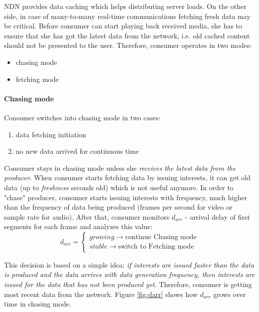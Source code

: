 \documentclass[10pt]{proc}
\begin{document}
NDN provides data caching which helps distributing server loads. On the other side, in case of many-to-many real-time communications fetching fresh data may be critical. 
Before consumer can start playing back received media, she has to ensure that she has got the latest data from the network, i.e. old cached content should not be presented to the user. Therefore, consumer operates in two modes: 
\begin{itemize}
\item chasing mode 
\item fetching mode
\end{itemize}

\paragraph{Chasing mode}
Consumer switches into chasing mode in two cases:
\begin{enumerate}
\item data fetching initiation
\item no new data arrived for continuous time
\end{enumerate}

Consumer stays in chasing mode unless she \textit{receives the latest data from the producer}. When consumer starts fetching data by issuing interests, it can get old data (up to \textit{freshness} seconds old) which is not useful anymore. In order to "chase" producer, consumer starts issuing interests with frequency, much higher than the frequency of data being produced (frames per second for video or sample rate for audio). After that, consumer monitors $d_{arr}$ - arrival delay of first segments for each frame and analyzes this value:
\begin{equation}
d_{arr} = \left\{\begin{matrix}
growing \rightarrow \mbox{continue Chasing mode}\\ 
stable \rightarrow \mbox{switch to Fetching mode}
\end{matrix}\right.
\end{equation}

This decision is based on a simple idea: \textit{if interests are issued faster than the data is produced and the data arrives with data generation frequency, then interests are issued for the data that has not been produced yet}. Therefore, consumer is getting most recent data from the network. Figure \ref{fig:darr} shows how $d_{arr}$ grows over time in chasing mode.
\end{document}
